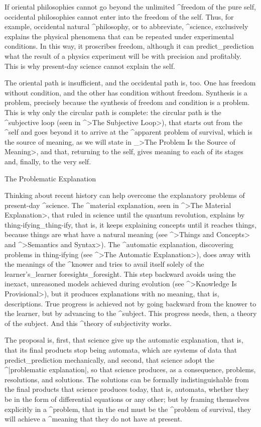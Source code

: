 If oriental philosophies cannot go beyond the unlimited ^{freedom} of
the pure self, occidental philosophies cannot enter into the freedom of
the self. Thus, for example, occidental natural ^{philosophy}, or to
abbreviate, ^{science}, exclusively explains the physical phenomena that
can be repeated under experimental conditions. In this way, it
proscribes freedom, although it can predict_{prediction} what the result
of a physics experiment will be with precision and profitably. This is
why present-day science cannot explain the self.

The oriental path is insufficient, and the occidental path is, too. One
has freedom without condition, and the other has condition without
freedom. Synthesis is a problem, precisely because the synthesis of
freedom and condition is a problem. This is why only the circular path
is complete: the circular path is the ^{subjective loop} (seen in ^>The
Subjective Loop>), that starts out from the ^{self} and goes beyond it
to arrive at the ^{apparent problem} of survival, which is the source of
meaning, as we will state in _>The Problem Is the Source of Meaning>,
and that, returning to the self, gives meaning to each of its stages
and, finally, to the very self.


\Section The Problematic Explanation

Thinking about recent history can help overcome the explanatory problems
of present-day ^{science}. The ^{material explanation}, seen in ^>The
Material Explanation>, that ruled in science until the quantum
revolution, explains by thing-ifying_{thing-ify}, that is, it keeps
explaining concepts until it reaches things, because things are what
have a natural meaning (see ^>Things and Concepts> and ^>Semantics and
Syntax>). The ^{automatic explanation}, discovering problems in
thing-ifying (see ^>The Automatic Explanation>), does away with the
meanings of the ^{knower} and tries to avail itself solely of the
learner's_{learner} foresights_{foresight}. This step backward avoids
using the inexact, unreasoned models achieved during evolution (see
^>Knowledge Is Provisional>), but it produces explanations with no
meaning, that is, descriptions. True progress is achieved not by going
backward from the knower to the learner, but by advancing to the
^{subject}. This progress needs, then, a theory of the subject. And this
^{theory of subjectivity} works.


The proposal is, first, that science give up the automatic explanation,
that is, that its final products stop being automata, which are systems
of data that predict_{prediction} mechanically, and second, that science
adopt the ^|problematic explanation|, so that science produces, as a
consequence, problems, resolutions, and solutions. The solutions can be
formally indistinguishable from the final products that science produces
today, that is, automata, whether they be in the form of differential
equations or any other; but by framing themselves explicitly in a
^{problem}, that in the end must be the ^{problem of survival}, they
will achieve a ^{meaning} that they do not have at present.


